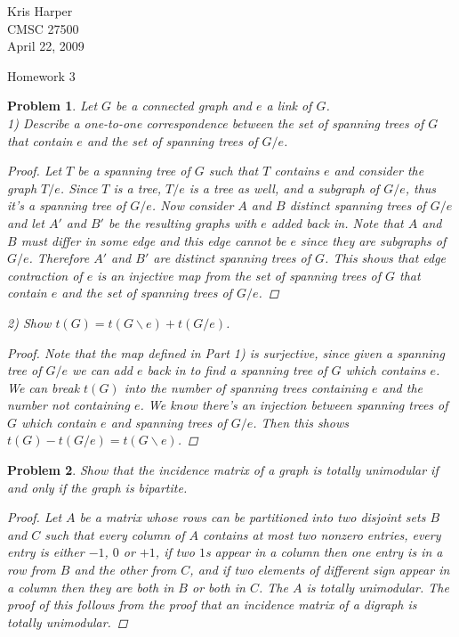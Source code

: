 \documentclass{article}
\newtheorem{problem}{Problem}
\begin{document}
\begin{flushright}
Kris Harper\\

CMSC 27500\\

April 22, 2009
\end{flushright}

\begin{center}
Homework 3
\end{center}

\begin{flushleft}

\begin{problem}
Let $G$ be a connected graph and $e$ a link of $G$.\\
1) Describe a one-to-one correspondence between the set of spanning trees of $G$ that contain $e$ and the set of spanning trees of $G / e$.
\begin{proof}
Let $T$ be a spanning tree of $G$ such that $T$ contains $e$ and consider the graph $T / e$. Since $T$ is a tree, $T / e$ is a tree as well, and a subgraph of $G / e$, thus it's a spanning tree of $G /e$. Now consider $A$ and $B$ distinct spanning trees of $G / e$ and let $A'$ and $B'$ be the resulting graphs with $e$ added back in. Note that $A$ and $B$ must differ in some edge and this edge cannot be $e$ since they are subgraphs of $G / e$. Therefore $A'$ and $B'$ are distinct spanning trees of $G$. This shows that edge contraction of $e$ is an injective map from the set of spanning trees of $G$ that contain $e$ and the set of spanning trees of $G / e$.
\end{proof}
2) Show $t(G) = t(G \backslash e) + t(G / e)$.
\begin{proof}
Note that the map defined in Part 1) is surjective, since given a spanning tree of $G / e$ we can add $e$ back in to find a spanning tree of $G$ which contains $e$. We can break $t(G)$ into the number of spanning trees containing $e$ and the number not containing $e$. We know there's an injection between spanning trees of $G$ which contain $e$ and spanning trees of $G /e$. Then this shows $t(G) - t(G / e) = t(G \backslash e)$.
\end{proof}
\end{problem}

\begin{problem}
Show that the incidence matrix of a graph is totally unimodular if and only if the graph is bipartite.
\begin{proof}
Let $A$ be a matrix whose rows can be partitioned into two disjoint sets $B$ and $C$ such that every column of $A$ contains at most two nonzero entries, every entry is either $-1$, $0$ or $+1$, if two $1$s appear in a column then one entry is in a row from $B$ and the other from $C$, and if two elements of different sign appear in a column then they are both in $B$ or both in $C$. The $A$ is totally unimodular. The proof of this follows from the proof that an incidence matrix of a digraph is totally unimodular.\newline


\end{proof}
\end{problem}
\end{flushleft}
\end{document}
